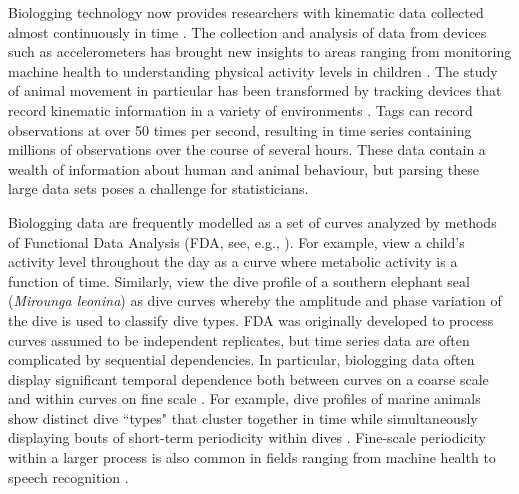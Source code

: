 
Biologging technology now provides researchers with kinematic data collected almost continuously in time \citep{Hooten:2017}.
The collection and analysis of data from devices such as accelerometers has brought new insights to areas ranging from monitoring machine health \citep{Getman:2009} to understanding physical activity levels in children \citep{Morris:2007}. The study of animal movement in particular has been transformed by tracking devices that record kinematic information in a variety of environments \citep{Borger:2020,Dot:2016b}. Tags can record observations at over 50 times per second, resulting in time series containing millions of observations over the course of several hours. These data contain a wealth of information about human and animal behaviour, but parsing these large data sets poses a challenge for statisticians.

Biologging data are frequently modelled as a set of curves analyzed by methods of Functional Data Analysis (FDA, see, e.g., \citet{Ramsay:2005}). For example, \citet{Morris:2007} view a child's activity level throughout the day as a curve where metabolic activity is a function of time. Similarly, \citet{Fu:2017} view the dive profile of a southern elephant seal (\textit{Mirounga leonina}) as dive curves whereby the amplitude and phase variation of the dive is used to classify dive types.
%
FDA was originally developed to process curves assumed to be independent replicates, but time series data are often complicated by sequential dependencies. In particular, biologging data often display significant temporal dependence both between curves on a coarse scale and within curves on fine scale \citep{Barajas:2017}.
For example, dive profiles of marine animals show distinct dive ``types" that cluster together in time  \citep{Tennessen:2019b} while simultaneously displaying bouts of short-term periodicity within dives \citep{Adam:2019}. Fine-scale periodicity within a larger process is also common in fields ranging from machine health \citep{Xin:2018,Lucero:2019} to speech recognition \citep{Juang:1991}.

